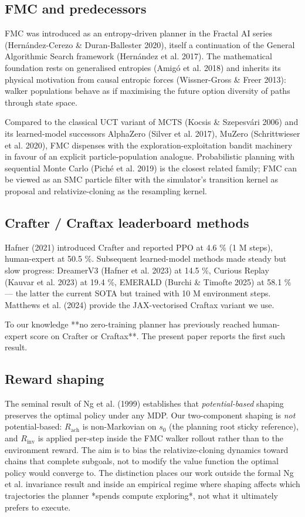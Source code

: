 \documentclass[11pt,letterpaper]{article}
\begin{document}
\subsection{FMC and predecessors}

FMC was introduced as an entropy-driven planner in the Fractal AI
series (Hernández-Cerezo \& Duran-Ballester 2020), itself a continuation
of the General Algorithmic Search framework (Hernández et al. 2017).
The mathematical foundation rests on generalised entropies (Amigó et
al. 2018) and inherits its physical motivation from causal entropic
forces (Wissner-Gross \& Freer 2013): walker populations behave as if
maximising the future option diversity of paths through state space.

Compared to the classical UCT variant of MCTS (Kocsis \& Szepesvári
2006) and its learned-model successors AlphaZero (Silver et al. 2017),
MuZero (Schrittwieser et al. 2020), FMC dispenses with the
exploration-exploitation bandit machinery in favour of an explicit
particle-population analogue. Probabilistic planning with sequential
Monte Carlo (Piché et al. 2019) is the closest related family; FMC
can be viewed as an SMC particle filter with the simulator's transition
kernel as proposal and relativize-cloning as the resampling kernel.

\subsection{Crafter / Craftax leaderboard methods}

Hafner (2021) introduced Crafter and reported PPO at 4.6 \% (1 M steps),
human-expert at 50.5 \%. Subsequent learned-model methods made steady
but slow progress: DreamerV3 (Hafner et al. 2023) at 14.5 \%, Curious
Replay (Kauvar et al. 2023) at 19.4 \%, EMERALD (Burchi \& Timofte 2025) at
58.1 \% — the latter the current SOTA but trained with 10 M
environment steps. Matthews et al. (2024) provide the JAX-vectorised
Craftax variant we use.

To our knowledge **no zero-training planner has previously reached
human-expert score on Crafter or Craftax**. The present paper reports
the first such result.

\subsection{Reward shaping}

The seminal result of Ng et al. (1999) establishes that \emph{potential-based}
shaping preserves the optimal policy under any MDP. Our two-component
shaping is \emph{not} potential-based: $R_{\text{ach}}$ is non-Markovian on
$s_0$ (the planning root sticky reference), and $R_{\text{inv}}$ is
applied per-step inside the FMC walker rollout rather than to the
environment reward. The aim is to bias the relativize-cloning dynamics
toward chains that complete subgoals, not to modify the value function
the optimal policy would converge to. The distinction places our work
outside the formal Ng et al. invariance result and inside an empirical
regime where shaping affects which trajectories the planner *spends
compute exploring*, not what it ultimately prefers to execute.
\end{document}
